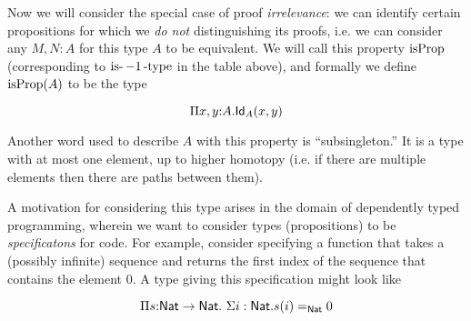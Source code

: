 \documentclass[11pt]{article}
\begin{document}
Now we will consider the special case of proof {\em irrelevance}: we can
identify certain propositions for which we {\em do not}
distinguishing its proofs, i.e. we can consider any $M, N : A$ for this type
$A$ to be equivalent. We will call this property $\operatorname{isProp}$
(corresponding to $\operatorname{is-}-1\operatorname{-type}$ in the table above), and formally
we define $\operatorname{isProp}(A)$ to be the type

\[
\Pi{x,y}{:}A.\mathsf{Id}_{A}(x,y)
\]

Another word used to describe $A$ with this property is ``subsingleton.''
It is a type with at most one element, up to higher homotopy (i.e. if there
are multiple elements then there are paths between them).

A motivation for considering this type arises in the domain of dependently
typed programming, wherein we want to consider types (propositions) to be
{\em specificatons} for code. For example, consider specifying a function
that takes a (possibly infinite) sequence and returns the first index of
the sequence that contains the element $0$. A type giving this
specification might look like

\[
\Pi{s{:}\mathsf{Nat}\to\mathsf{Nat}}.\ \Sigma{i:\mathsf{Nat}}.s(i)=_{\mathsf{Nat}} 0
\]
\end{document}
